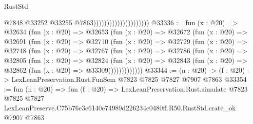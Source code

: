 \begin{lexlean}{RustStd}
\begin{coremodule}
                                              @7848
                                              @33252
                                              @33255
                                              @7863)))))))))))))))))))))
@33336 := fun (x : @20) =>
  @32634
    (fun (x : @20) =>
    @32653
      (fun (x : @20) =>
      @32672
        (fun (x : @20) =>
        @32691
          (fun (x : @20) =>
          @32710
            (fun (x : @20) =>
            @32729
              (fun (x : @20) =>
              @32748
                (fun (x : @20) =>
                @32767
                  (fun (x : @20) =>
                  @32786
                    (fun (x : @20) =>
                    @32805
                      (fun (x : @20) =>
                      @32824
                        (fun (x : @20) =>
                        @32843 (fun (x : @20) => @32862 (fun (x : @20) => @33309)))))))))))))
@33344 := (n : @20) -> (f : @20) -> LexLeanPreservation.Rust.FunSem @7823 @7825 @7827 @7907 @7863
@33354 := fun (n : @20) =>
  fun (f : @20) =>
  LexLeanPreservation.Rust.simulate
    @7823
    @7825
    @7827
    LexLeanPreserve.C75b76e3c6140e74989d226234e0480ff.R50.RustStd.crate_ok
    @7907
    @7863
\end{coremodule}
\end{lexlean}
